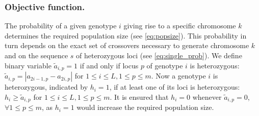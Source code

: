 \documentclass[runningheads]{llncs}
\begin{document}
\subsubsection{Objective function.}

The probability of a given genotype $i$ giving rise to a specific chromosome $k$ determines the 
required population size (see \eqref{eq:popsize}). This probability in turn depends on the exact set of
crossovers necessary to generate chromosome $k$ and on the sequence $s$ of heterozygous
loci (see \eqref{eq:single_prob}). We define binary variable $\tilde{a}_{i,p}=1$ if and only if locus $p$ of genotype $i$ is heterozygous: $\tilde{a}_{i,p} = |a_{2i-1,p} - a_{2i,p}|$ for $1 \leq i \leq L, 1 \leq p \leq m$.
Now a genotype $i$ is heterozygous, indicated by $h_i=1$, if at least one of its loci is heterozygous: $h_i \geq \tilde{a}_{i,p}$ for  $1 \leq i \leq L, 1 \leq p \leq m$.
It is ensured that $h_i=0$ whenever $\tilde{a}_{i,p}=0$, $\forall 1 \leq p \leq m$, as $h_i=1$ would increase the required population size.
\end{document}
